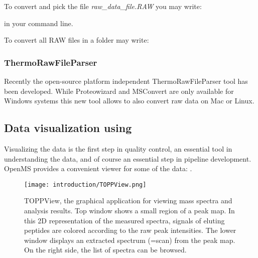 \noindent To convert and pick the file \textit{raw\_data\_file.RAW} you may write:

\noindent{}

\noindent in your command line.

\noindent To convert all RAW files in a folder may write:

\noindent{}


\subsubsection{ThermoRawFileParser}

Recently the open-source platform independent ThermoRawFileParser tool has been developed. While Proteowizard and MSConvert are only available for Windows systems this new tool allows to also convert raw data on Mac or Linux.



\subsection{Data visualization using }
\label{Data_Visualization}

Visualizing the data is the first step in quality control, an essential tool in understanding the data, and of course an essential step in pipeline development.
OpenMS provides a convenient viewer for some of the data: .

\begin{figure}
\texttt{[image: introduction/TOPPView.png]}
\caption{TOPPView, the graphical application for viewing mass spectra and analysis results. Top window shows a small region of a peak map. In this 2D representation of the measured spectra, signals of eluting peptides are colored according to the raw peak intensities. The lower window displays an extracted spectrum (=scan) from the peak map. On the right side, the list of spectra can be browsed.}
\label{fig:toppview}
\end{figure}

